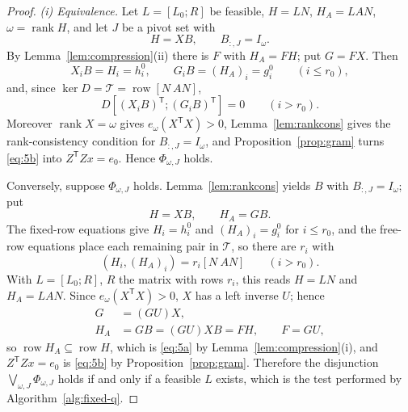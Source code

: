 \documentclass[journal]{IEEEtran}
\theoremstyle{plainn}
\theoremstyle{remark}
\begin{document}
\begin{proof}
\emph{(i) Equivalence.} Let $L=[L_0;R]$ be feasible, $H=LN$, $H_A=LAN$,
$\omega=\operatorname{rank}H$, and let $J$ be a pivot set with
\[
H=XB,\qquad B_{:,J}=I_\omega .
\]
By Lemma~\ref{lem:compression}(ii) there is $F$ with $H_A=FH$; put $G=FX$.
Then
\[
X_iB=H_i=h_i^0,\qquad G_iB=(H_A)_i=g_i^0\qquad(i\le r_0),
\]
and, since $\ker D=\mathcal T=\operatorname{row}[N\ AN]$,
\[
D[(X_iB)^{\mathsf T};(G_iB)^{\mathsf T}]=0\qquad(i>r_0).
\]
Moreover $\operatorname{rank}X=\omega$ gives $e_\omega(X^{\mathsf T}X)>0$,
Lemma~\ref{lem:rankcons} gives the rank-consistency condition for
$B_{:,J}=I_\omega$, and Proposition~\ref{prop:gram} turns \eqref{eq:5b} into
$Z^{\mathsf T}Zx=e_0$. Hence $\Phi_{\omega,J}$ holds.

Conversely, suppose $\Phi_{\omega,J}$ holds. Lemma~\ref{lem:rankcons} yields
$B$ with $B_{:,J}=I_\omega$; put
\[
H=XB,\qquad H_A=GB .
\]
The fixed-row equations give $H_i=h_i^0$ and $(H_A)_i=g_i^0$ for $i\le r_0$,
and the free-row equations place each remaining pair in $\mathcal T$, so there
are $r_i$ with
\[
(H_i,(H_A)_i)=r_i[N\ AN]\qquad(i>r_0).
\]
With $L=[L_0;R]$, $R$ the matrix with rows $r_i$, this reads $H=LN$ and
$H_A=LAN$. Since $e_\omega(X^{\mathsf T}X)>0$, $X$ has a left inverse $U$;
hence
\[
\begin{aligned}
G&=(GU)X,\\
H_A&=GB=(GU)XB=FH,\qquad F=GU,
\end{aligned}
\]
so $\operatorname{row}H_A\subseteq\operatorname{row}H$, which is
\eqref{eq:5a} by Lemma~\ref{lem:compression}(i), and $Z^{\mathsf T}Zx=e_0$ is
\eqref{eq:5b} by Proposition~\ref{prop:gram}. Therefore the disjunction
$\bigvee_{\omega,J}\Phi_{\omega,J}$ holds if and only if a feasible $L$
exists, which is the test performed by Algorithm~\ref{alg:fixed-q}.


\end{proof}
\end{document}
